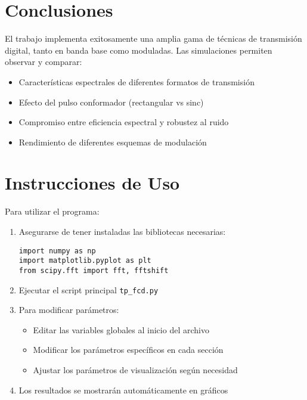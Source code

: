 \documentclass[12pt,a4paper]{article}
\begin{document}
\section{Conclusiones}
El trabajo implementa exitosamente una amplia gama de técnicas de transmisión digital, tanto en banda base como moduladas.
Las simulaciones permiten observar y comparar:
\begin{itemize}
    \item Características espectrales de diferentes formatos de transmisión
    \item Efecto del pulso conformador (rectangular vs sinc)
    \item Compromiso entre eficiencia espectral y robustez al ruido
    \item Rendimiento de diferentes esquemas de modulación
\end{itemize}

\section{Instrucciones de Uso}
Para utilizar el programa:

\begin{enumerate}
    \item Asegurarse de tener instaladas las bibliotecas necesarias:
    \begin{lstlisting}
import numpy as np
import matplotlib.pyplot as plt
from scipy.fft import fft, fftshift
    \end{lstlisting}
    
    \item Ejecutar el script principal \texttt{tp\_fcd.py}
    \item Para modificar parámetros:
    \begin{itemize}
        \item Editar las variables globales al inicio del archivo
        \item Modificar los parámetros específicos en cada sección
        \item Ajustar los parámetros de visualización según necesidad
    \end{itemize}
    \item Los resultados se mostrarán automáticamente en gráficos
\end{enumerate}
\end{document}
